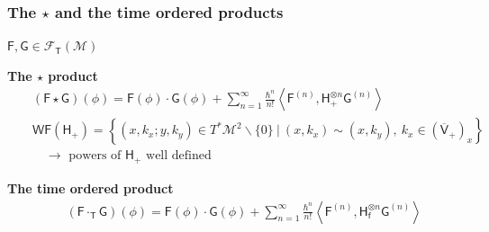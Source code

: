 \documentclass[9pt]{beamer}
\newcommand{\Tdot}{\cdot_\Tsf} %
\newcommand{\Smearip}[1]{\left\langle #1 \right\rangle} %
\newcommand{\WF}{\mathsf{WF}} %
\newcommand{\Fcal}{\mathcal{F}}
\newcommand{\Mcal}{\mathcal{M}}
\newcommand{\Fsf}{\mathsf{F}}
\newcommand{\Gsf}{\mathsf{G}}
\newcommand{\Hsf}{\mathsf{H}}
\newcommand{\Tsf}{\mathsf{T}}
\newcommand{\Vsf}{\mathsf{V}}
\newcommand{\dsf}{\mathsf{d}}
\newcommand{\fsf}{\mathsf{f}}
\begin{document}
\begin{frame}[label=details_products]

\frametitle{The $\star$ and the time ordered products}

$\Fsf, \Gsf \in \Fcal_\Tsf(\Mcal)$ %
\vspace*{-10pt}
\begin{block}{\vspace*{-3ex}}
  \textbf{The $\star$ product}
  \vspace*{-10pt}
\begin{eqnarray*}
   && (\Fsf \star \Gsf)(\phi) = \Fsf(\phi) \cdot \Gsf(\phi) + \sum_{n=1}^{\infty} \frac{\hbar^n}{n!} \Smearip{\Fsf^{(n)},\Hsf_{+}^{\otimes n} \Gsf^{(n)}} \\
  && \WF(\Hsf_+) = \left\{ \left( x, k_x ; y , k_y \right) \in T^\ast\Mcal^2 \backslash \{0\} \ | \ (x,k_x) \sim (x,k_y), \ k_x \in (\overline{\Vsf}_+)_x \right\} \\
  && \quad \to \mbox{ powers of } \Hsf_+ \mbox{ well defined} 
\end{eqnarray*}
\end{block}
\begin{block}{\vspace*{-3ex}}
\textbf{The time ordered product}
\vspace*{-10pt}
 \begin{eqnarray*}
   && (\Fsf \Tdot \Gsf)(\phi) = \Fsf(\phi) \cdot \Gsf(\phi) + \sum_{n=1}^{\infty} \frac{\hbar^n}{n!} \Smearip{\Fsf^{(n)},\Hsf_{\fsf}^{\otimes n} \Gsf^{(n)}} %
\end{eqnarray*}
\end{block}

\hfill \hyperlink{products}{}

\end{frame}



\end{document}
